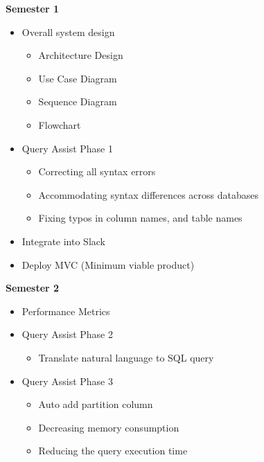 \textbf{Semester 1}
\begin{itemize}
    \item  Overall system design
    \begin{itemize}
        \item Architecture Design
        \item Use Case Diagram
        \item Sequence Diagram
        \item Flowchart
    \end{itemize}

    \item  Query Assist Phase 1
    \begin{itemize}
        \item Correcting all syntax errors
        \item Accommodating syntax differences across databases
        \item Fixing typos in column names, and table names
    \end{itemize}

    \item  Integrate into Slack
    \item Deploy MVC (Minimum viable product)
\end{itemize}
\textbf{Semester 2}
\begin{itemize}
    \item  Performance Metrics

    \item  Query Assist Phase 2
    \begin{itemize}
        \item Translate natural language to SQL query
    \end{itemize}

    \item Query Assist Phase 3
    \begin{itemize}
        \item Auto add partition column
        \item Decreasing memory consumption
        \item Reducing the query execution time
    \end{itemize}
\end{itemize}
\pagebreak
